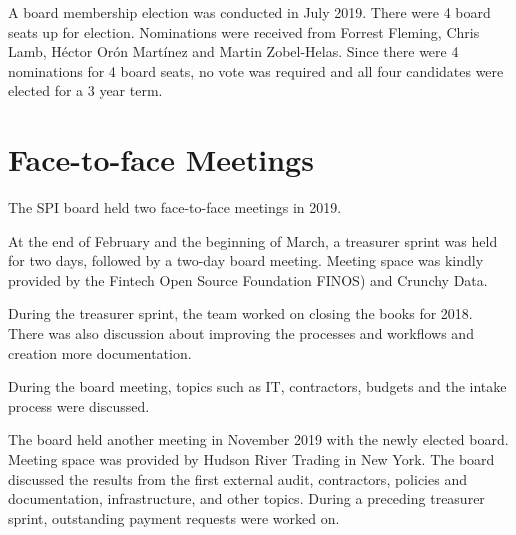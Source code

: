 \documentclass[a4paper]{report}
\begin{document}
A board membership election was conducted in July 2019.  There were 4
board seats up for election.  Nominations were received from Forrest
Fleming, Chris Lamb, Héctor Orón Martínez and Martin Zobel-Helas.  Since
there were 4 nominations for 4 board seats, no vote was required and all
four candidates were elected for a 3 year term.

\section{Face-to-face Meetings}

The SPI board held two face-to-face meetings in 2019.

At the end of February and the beginning of March, a treasurer sprint
was held for two days, followed by a two-day board meeting.  Meeting
space was kindly provided by the Fintech Open Source Foundation
FINOS) and Crunchy Data.

During the treasurer sprint, the team worked on closing the books
for 2018.  There was also discussion about improving the processes
and workflows and creation more documentation.

During the board meeting, topics such as IT, contractors, budgets
and the intake process were discussed.

The board held another meeting in November 2019 with the newly
elected board.  Meeting space was provided by Hudson River Trading
in New York.  The board discussed the results from the first external
audit, contractors, policies and documentation, infrastructure,
and other topics.  During a preceding treasurer sprint, outstanding
payment requests were worked on.
\end{document}
